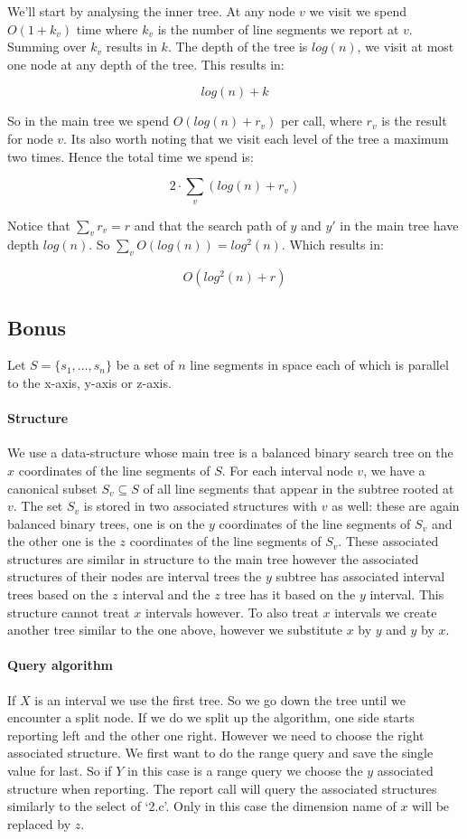 \documentclass{article}
\begin{document}
We'll start by analysing the inner tree.
At any node $v$ we visit we spend $O(1+k_v)$ time where
$k_v$ is the number of line segments we report at $v$. Summing
over $k_v$ results in $k$. The depth of the tree is $log(n)$,
we visit at most one node at any depth of the tree. This results in:

\[ log(n)+k\]

So in the main tree we spend $O(log(n)+r_v)$ per call, where $r_v$ is
the result for node $v$. Its also worth noting that we visit each level
of the tree a maximum two times. Hence the total time we spend is:

\[ 2\cdot \sum_v(log(n)+r_v)\]

Notice that $\sum_v r_v = r$ and that the search path of $y$ and $y'$
in the main tree have depth $log(n)$. So $\sum_v O(log(n))=log^2(n)$.
Which results in:

\[ O(log^2(n)+r) \]

\subsection{Bonus}
Let $S=\{s_1,\dots,s_n\}$ be a set of $n$ line segments in space each
of which is parallel to the x-axis, y-axis or z-axis.
\paragraph{Structure} We use a data-structure whose main tree is a balanced
binary search tree on the $x$ coordinates of the line segments of $S$.
For each interval node $v$, we have a canonical subset $S_v\subseteq S$
of all line segments that appear in the subtree rooted at $v$. The
set $S_v$ is stored in two associated structures with $v$ as well:
these are again balanced binary trees, one is on the $y$ coordinates
of the line segments of $S_v$ and the other one is the $z$ coordinates
of the line segments of $S_v$. These associated structures are similar
in structure to the main tree however the associated structures of their
nodes are interval trees the $y$
subtree has associated interval trees based on the $z$ interval and
the $z$ tree has it based on the $y$ interval.
This structure cannot treat $x$ intervals however. To also treat
$x$ intervals we create another tree similar to the one above, however
we substitute $x$ by $y$ and $y$ by $x$.
\paragraph{Query algorithm} If $X$ is an interval we use the first tree.
So we go down the tree until we encounter a split node. If we do we
split up the algorithm, one side starts reporting left and the other one
right. However we need to choose the right associated
structure. We first want to do the range query and save the single value for
last. So if $Y$ in this case is a range query we choose the $y$ associated
structure when reporting.
The report call will query the associated structures similarly
to the select of `2.c'. Only in this case the dimension name of $x$ will be
replaced by $z$.
\end{document}
